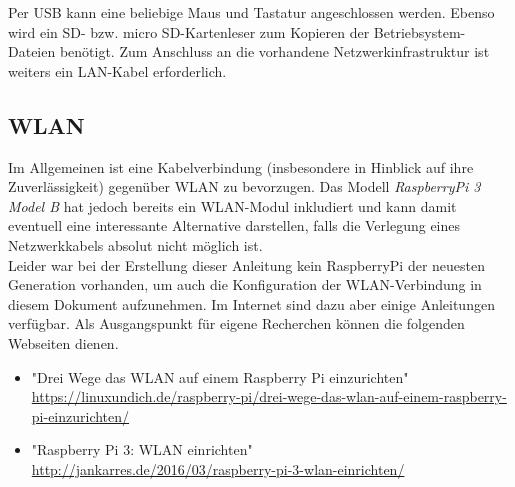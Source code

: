 Per USB kann eine beliebige Maus und Tastatur angeschlossen werden. 
Ebenso wird ein SD- bzw. micro SD-Kartenleser zum Kopieren der Betriebsystem-Dateien benötigt. 
Zum Anschluss an die vorhandene Netzwerkinfrastruktur ist weiters ein LAN-Kabel erforderlich.

\subsection{WLAN}
\label{sec:rpiwlan}

Im Allgemeinen ist eine Kabelverbindung (insbesondere in Hinblick auf ihre Zuverlässigkeit) gegenüber WLAN zu bevorzugen. 
Das Modell \textit{RaspberryPi 3 Model B} hat jedoch bereits ein WLAN-Modul inkludiert und kann damit eventuell eine interessante Alternative darstellen, falls die Verlegung eines Netzwerkkabels absolut nicht möglich ist.\\
Leider war bei der Erstellung dieser Anleitung kein RaspberryPi der neuesten Generation vorhanden, um auch die Konfiguration der WLAN-Verbindung in diesem Dokument aufzunehmen. Im Internet sind dazu aber einige Anleitungen verfügbar.
Als Ausgangspunkt für eigene Recherchen können die folgenden Webseiten dienen.

\begin{itemize}
	\item "Drei Wege das WLAN auf einem Raspberry Pi einzurichten"\\
		\url{https://linuxundich.de/raspberry-pi/drei-wege-das-wlan-auf-einem-raspberry-pi-einzurichten/}
	\item "Raspberry Pi 3: WLAN einrichten"\\
		\url{http://jankarres.de/2016/03/raspberry-pi-3-wlan-einrichten/}
\end{itemize}



